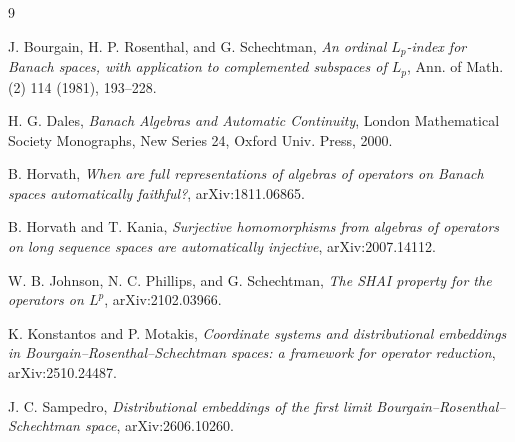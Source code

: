 \documentclass[11pt]{article}
\begin{document}
\begin{thebibliography}{9}

J. Bourgain, H. P. Rosenthal, and G. Schechtman,
\emph{An ordinal \(L_p\)-index for Banach spaces, with application to
complemented subspaces of \(L_p\)},
Ann. of Math. (2) 114 (1981), 193--228.

H. G. Dales,
\emph{Banach Algebras and Automatic Continuity},
London Mathematical Society Monographs, New Series 24, Oxford Univ. Press,
2000.

B. Horvath,
\emph{When are full representations of algebras of operators on Banach spaces
automatically faithful?},
arXiv:1811.06865.

B. Horvath and T. Kania,
\emph{Surjective homomorphisms from algebras of operators on long sequence
spaces are automatically injective},
arXiv:2007.14112.

W. B. Johnson, N. C. Phillips, and G. Schechtman,
\emph{The SHAI property for the operators on \(L^p\)},
arXiv:2102.03966.

K. Konstantos and P. Motakis,
\emph{Coordinate systems and distributional embeddings in
Bourgain--Rosenthal--Schechtman spaces: a framework for operator reduction},
arXiv:2510.24487.

J. C. Sampedro,
\emph{Distributional embeddings of the first limit
Bourgain--Rosenthal--Schechtman space},
arXiv:2606.10260.

\end{thebibliography}
\end{document}
